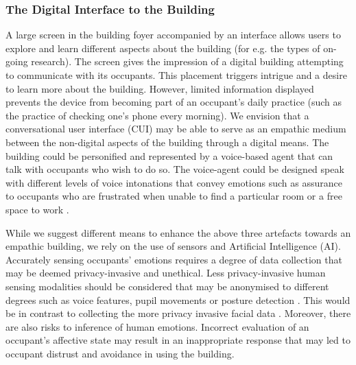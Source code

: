 \documentclass [sigconf] {acmart}
\begin{document}
\subsubsection*{The Digital Interface to the Building}
A large screen in the building foyer accompanied by an interface allows users to explore and learn different aspects about the building (for e.g. the types of on-going research). The screen gives the impression of a digital building attempting to communicate with its occupants. This placement triggers intrigue and a desire to learn more about the building. However, limited information displayed prevents the device from becoming part of an occupant's daily practice (such as the practice of checking one's phone every morning). We envision that a conversational user interface (CUI) may be able to serve as an empathic medium between the non-digital aspects of the building through a digital means. The building could be personified and represented by a voice-based agent that can talk with occupants who wish to do so. The voice-agent could be designed speak with different levels of voice intonations that convey emotions such as assurance to occupants who are frustrated when unable to find a particular room or a free space to work \cite{kuhne2020human}.

While we suggest different means to enhance the above three artefacts towards an empathic building, we rely on the use of sensors and Artificial Intelligence (AI). Accurately sensing occupants' emotions requires a degree of data collection that may be deemed privacy-invasive and unethical. Less privacy-invasive human sensing modalities should be considered that may be anonymised to different degrees such as voice features, pupil movements or posture detection \cite{siddiqui2021respiration, larradet2020toward}. This would be in contrast to collecting the more privacy invasive facial data \cite{bullington2005affective}. Moreover, there are also risks to inference of human emotions. Incorrect evaluation of an occupant's affective state may result in an inappropriate response that may led to occupant distrust and avoidance in using the building.

\end{document}
